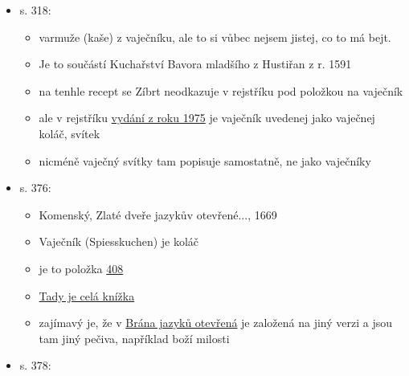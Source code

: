 \begin{itemize}
\begin{itemize}
\begin{itemize}
      \begin{itemize}
      \tightlist
      \item
        vařený hrách se smíchá s vejci, pak vaří v másle, po uvaření se
        pak peče na rožnících a polévá vejci
      \end{itemize}
    \end{itemize}
  \item
    s. 318:

    \begin{itemize}
    \tightlist
    \item
      varmuže (kaše) z vaječníku, ale to si vůbec nejsem jistej, co to
      má bejt.
    \item
      Je to součástí Kuchařství Bavora mladšího z Hustiřan z r. 1591
    \item
      na tenhle recept se Zíbrt neodkazuje v rejstříku pod položkou na
      vaječník
    \item
      ale v rejstříku
      \href{https://ndk.cz/uuid/uuid:27bccb70-88d6-11e3-997d-005056827e52}{vydání
      z roku 1975} je vaječník uvedenej jako vaječnej koláč, svítek
    \item
      nicméně vaječný svítky tam popisuje samostatně, ne jako vaječníky
    \end{itemize}
  \item
    s. 376:

    \begin{itemize}
    \tightlist
    \item
      Komenský, Zlaté dveře jazykův otevřené..., 1669
    \item
      Vaječník (Spiesskuchen) je koláč
    \item
      je to položka
      \href{https://vokabular.ujc.cas.cz/moduly/mluvnice/digitalni-kopie-detail/KomJanua1669/strana-76}{408}
    \item
      \href{https://vokabular.ujc.cas.cz/moduly/mluvnice/digitalni-kopie-info/KomJanua1669}{Tady
      je celá knížka}
    \item
      zajímavý je, že v
      \href{https://www.digitalniknihovna.cz/mzk/view/uuid:c53f79b0-b747-11e4-a7a2-005056827e51?page=uuid:c976bf00-bdcf-11e4-ba2b-5ef3fc9bb22f&fulltext=kol\%C3\%A1\%C4\%8D\%C5\%AF}{Brána
      jazyků otevřená} je založená na jiný verzi a jsou tam jiný pečiva,
      například boží milosti
    \end{itemize}
  \item
    s. 378:


\end{itemize}
\end{itemize}
